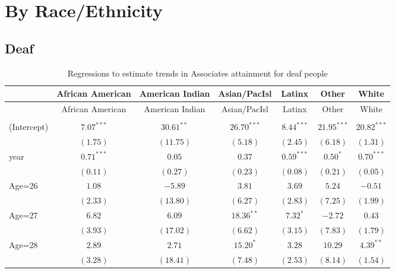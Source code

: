 \documentclass[fullpage]{paper}
\begin{document}
\section{ By Race/Ethnicity }

\subsection{ Deaf }

\begin{center}
\begin{longtable}{l c c c c c c }
\hline
 & African American & American Indian & Asian/PacIsl & Latinx & Other & White \\
\hline
\endfirsthead
\hline
 & African American & American Indian & Asian/PacIsl & Latinx & Other & White \\
\hline
\endhead
\hline
\endfoot
\hline
\multicolumn{7}{l}{\scriptsize{$^{***}p<0.001$, $^{**}p<0.01$, $^*p<0.05$}}\\
\caption{Regressions to estimate trends in Associates attainment for deaf people}
\label{table:coefficients}
\endlastfoot
(Intercept) & $7.07^{***}$  & $30.61^{**}$ & $26.70^{***}$ & $8.44^{***}$ & $21.95^{***}$ & $20.82^{***}$ \\
            & $(1.75)$      & $(11.75)$    & $(5.18)$      & $(2.45)$     & $(6.18)$      & $(1.31)$      \\
year        & $0.71^{***}$  & $0.05$       & $0.37$        & $0.59^{***}$ & $0.50^{*}$    & $0.70^{***}$  \\
            & $(0.11)$      & $(0.27)$     & $(0.23)$      & $(0.08)$     & $(0.21)$      & $(0.05)$      \\
Age=26      & $1.08$        & $-5.89$      & $3.81$        & $3.69$       & $5.24$        & $-0.51$       \\
            & $(2.33)$      & $(13.80)$    & $(6.27)$      & $(2.83)$     & $(7.25)$      & $(1.99)$      \\
Age=27      & $6.82$        & $6.09$       & $18.36^{**}$  & $7.32^{*}$   & $-2.72$       & $0.43$        \\
            & $(3.93)$      & $(17.02)$    & $(6.62)$      & $(3.15)$     & $(7.83)$      & $(1.79)$      \\
Age=28      & $2.89$        & $2.71$       & $15.20^{*}$   & $3.28$       & $10.29$       & $4.39^{**}$   \\
            & $(3.28)$      & $(18.41)$    & $(7.48)$      & $(2.53)$     & $(8.14)$      & $(1.54)$      \\

\end{longtable}
\end{center}
\end{document}

